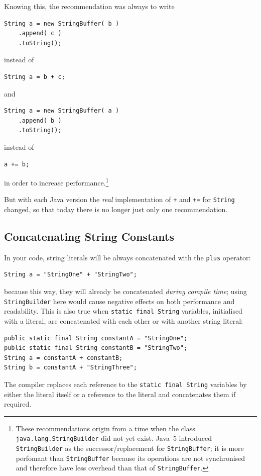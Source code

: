 \documentclass[11pt,a4paper, titlepage, parskip=half, headsepline, footsepline, cleardoublepage=current, headheight=1cm]{scrbook}
\begin{document}
Knowing this, the recommendation was always to write
\begin{lstlisting}
String a = new StringBuffer( b )
    .append( c )
    .toString();
\end{lstlisting}
instead of
\begin{lstlisting}
String a = b + c;
\end{lstlisting}
and
\begin{lstlisting}
String a = new StringBuffer( a )
    .append( b )
    .toString();
\end{lstlisting}
instead of
\begin{lstlisting}
a += b;
\end{lstlisting}
in order to increase performance.\footnote{These recommendations origin from a time when the class \lstinline|java.lang.StringBuilder|\autocite{ORACLE_DOC_STRINGBUILDER_CLASS} did not yet exist. Java~5 introduced \lstinline|StringBuilder| as the successor/replacement for \lstinline|StringBuffer|; it is more perfomant than \lstinline|StringBuffer| because its operations are not synchronised and therefore have less overhead than that of \lstinline|StringBuffer|.}

But with each Java version the \textit{real} implementation of \lstinline|+| and \lstinline|+=| for \lstinline|String| changed, so that today there is no longer just only one recommendation.

\subsection{Concatenating String Constants}
In your code, string literals will be always concatenated with the \verb#plus# operator:
\begin{lstlisting}
String a = "StringOne" + "StringTwo";
\end{lstlisting}
because this way, they will already be concatenated \textit{during compile time}; using \lstinline|StringBuilder| here would cause negative effects on both performance and readability. This is also true when \lstinline|static final String| variables, initialised with a literal, are concatenated with each other or with another string literal:
\begin{lstlisting}
public static final String constantA = "StringOne";
public static final String constantB = "StringTwo";
String a = constantA + constantB;
String b = constantA + "StringThree";
\end{lstlisting}
The compiler replaces each reference to the \lstinline|static final String| variables by either the literal itself or a reference to the literal and concatenates them if required.
\end{document}
